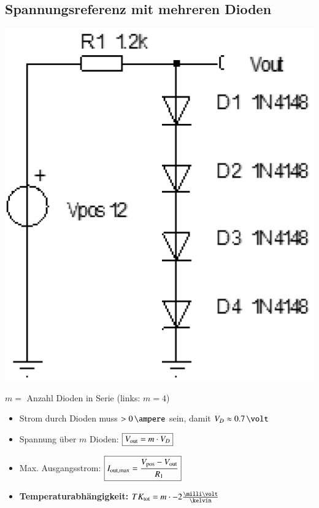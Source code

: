 \subsection{Spannungsreferenz mit mehreren Dioden}

\begin{minipage}[c]{0.25\columnwidth}
    \includegraphics[width=\columnwidth]{images/spannungsreferenz_4_dioden.png}
\end{minipage}
\hfill
\begin{minipage}[c]{0.73\columnwidth}
    $m = $ Anzahl Dioden in Serie (links: $m = 4$) 

    \begin{itemize}
        \item Strom durch Dioden muss $> 0 \, \ampere$ sein, damit $V_D \approx 0.7 \, \volt$
        \item Spannung über $m$ Dioden: $ \boxed{ V_{\rm out} = m \cdot V_D }$
        \item Max. Ausgangsstrom: $ \boxed{I_{\rm out, max} =  \frac{V_{\rm pos} - V_{\rm out}}{R_1}} $
        \item \textbf{Temperaturabhängigkeit:} $TK_{\rm tot} = m \cdot -2 \frac{\milli \volt}{\kelvin}$
    \end{itemize}

\end{minipage}


